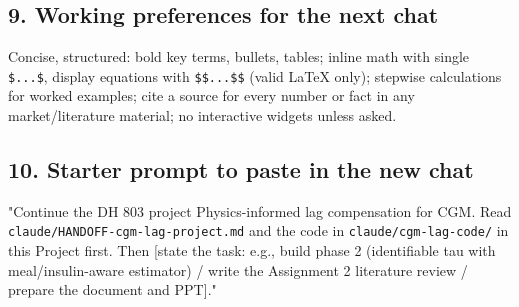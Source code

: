 \documentclass[11pt,a4paper]{article}
\begin{document}
\hypertarget{9-working-preferences-for-the-next-chat}{%
\subsection{9. Working preferences for the next
chat}\label{9-working-preferences-for-the-next-chat}}

Concise, structured: bold key terms, bullets, tables; inline math with
single \texttt{\$...\$}, display equations with \texttt{\$\$...\$\$}
(valid LaTeX only); stepwise calculations for worked examples; cite a
source for every number or fact in any market/literature material; no
interactive widgets unless asked.

\hypertarget{10-starter-prompt-to-paste-in-the-new-chat}{%
\subsection{10. Starter prompt to paste in the new
chat}\label{10-starter-prompt-to-paste-in-the-new-chat}}

"Continue the DH 803 project \textquotesingle Physics-informed lag
compensation for CGM\textquotesingle. Read
\texttt{claude/HANDOFF-cgm-lag-project.md} and the code in
\texttt{claude/cgm-lag-code/} in this Project first. Then {[}state the
task: e.g., build phase 2 (identifiable tau with meal/insulin-aware
estimator) / write the Assignment 2 literature review / prepare the
document and PPT{]}."
\end{document}
